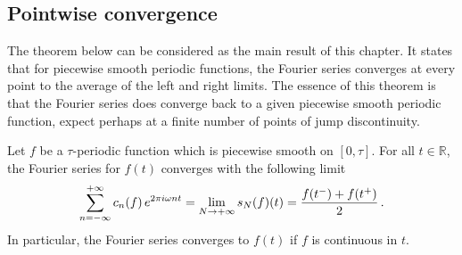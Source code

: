 \subsection{Pointwise convergence}
The theorem below can be considered as the main result of this chapter. It states that for
piecewise smooth periodic functions, the Fourier series converges at every point to the
average of the left and right limits. The essence of this theorem is that the Fourier
series does converge back to a given piecewise smooth periodic function, expect perhaps at
a finite number of points of jump discontinuity.
\begin{theorem}
  \label{thm:fourier-pt}
  Let $f$ be a $\tau$-periodic function which is piecewise smooth on $[0,\tau]$. For all
  $t\in\mathbb{R}$, the Fourier series for $f(t)$ converges with the following limit
  \begin{equation}
    \sum_{n=-\infty}^{+\infty}c_n(f)\,e^{2\pi i \omega nt}=\lim_{N\to+\infty}s_N(f)(t)
    =\frac{f(t^-)+f(t^+)}{2}\,.
  \end{equation}
  In particular, the Fourier series converges to $f(t)$ if $f$ is continuous in $t$.
\end{theorem}
